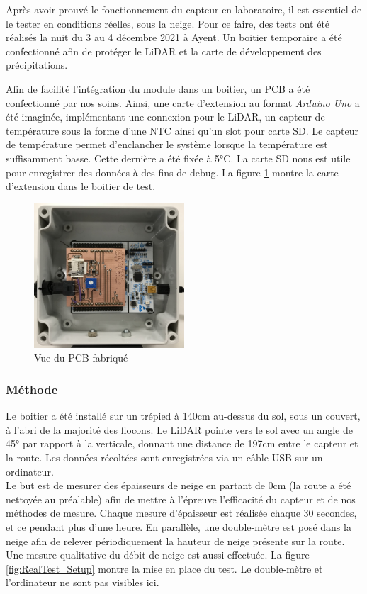 Après avoir prouvé le fonctionnement du capteur en laboratoire, il est essentiel de le tester en conditions
réelles, sous la neige. Pour ce faire, des tests ont été réalisés la nuit du 3 au 4 décembre 2021 à Ayent.
Un boitier temporaire a été confectionné afin de protéger le LiDAR et la carte de développement des 
précipitations.\par 
Afin de facilité l'intégration du module dans un boitier, un PCB a été confectionné par nos soins. Ainsi, une 
carte d'extension au format \emph{Arduino Uno} a été imaginée, implémentant une connexion pour le LiDAR, un
capteur de température sous la forme d'une NTC ainsi qu'un slot pour carte SD. Le capteur de température
permet d'enclancher le système lorsque la température est suffisamment basse. Cette dernière a été fixée 
à 5°C. La carte SD nous est utile pour enregistrer des données à des fins de debug. La figure \ref{fig:PCB}
montre la carte d'extension dans le boitier de test.

\begin{figure}[H]
    \centering
    \includegraphics[width=0.5\textwidth]{Images/photos_PGA/testboxinside.jpg}
    \caption{Vue du PCB fabriqué}
    \label{fig:PCB}
\end{figure}

\subsubsection{Méthode}

Le boitier a été installé sur un trépied à 140cm au-dessus du sol, sous un couvert, à l'abri de la majorité
des flocons. Le LiDAR pointe vers le sol avec un angle de 45° par rapport à la verticale, donnant une
distance de 197cm entre le capteur et la route. Les données récoltées sont enregistrées via un câble 
USB sur un ordinateur.\\
Le but est de mesurer des épaisseurs de neige en partant de 0cm (la route a été nettoyée au préalable)
afin de mettre à l'épreuve l'efficacité du capteur et de nos méthodes de mesure. Chaque mesure d'épaisseur 
est réalisée chaque 30 secondes, et ce pendant plus d'une heure. En parallèle, une double-mètre est posé 
dans la neige afin de relever périodiquement la hauteur de neige présente sur la route. Une mesure
qualitative du débit de neige est aussi effectuée. La figure \ref{fig:RealTest_Setup} montre la mise en
place du test. Le double-mètre et l'ordinateur ne sont pas visibles ici.

